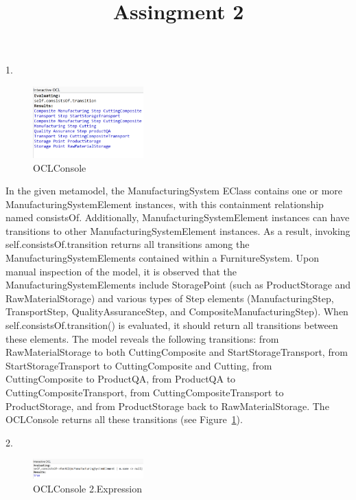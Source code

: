 \documentclass{article}
\title{Assingment 2}
\author{}
\date{}
\begin{document}
\maketitle

1. \begin{figure}
    \centering
    \includegraphics[width=0.38\textwidth]{images/Pasted image 20250518183913.png}
    \caption{OCLConsole}
    \label{fig:metamodel}
\end{figure}

In the given metamodel, the ManufacturingSystem EClass contains one or more ManufacturingSystemElement instances, with this containment relationship named consistsOf. Additionally, ManufacturingSystemElement instances can have transitions to other ManufacturingSystemElement instances. As a result, invoking self.consistsOf.transition returns all transitions among the ManufacturingSystemElements contained within a FurnitureSystem. Upon manual inspection of the model, it is observed that the ManufacturingSystemElements include StoragePoint (such as ProductStorage and RawMaterialStorage) and various types of Step elements (ManufacturingStep, TransportStep, QualityAssuranceStep, and CompositeManufacturingStep). When self.consistsOf.transition() is evaluated, it should return all transitions between these elements. The model reveals the following transitions: from RawMaterialStorage to both CuttingComposite and StartStorageTransport, from StartStorageTransport to CuttingComposite and Cutting, from CuttingComposite to ProductQA, from ProductQA to CuttingCompositeTransport, from CuttingCompositeTransport to ProductStorage, and from ProductStorage back to RawMaterialStorage. The OCLConsole returns all these transitions (see Figure~\ref{fig:metamodel}).



2. \begin{figure}
    \centering
    \includegraphics[width=0.38\textwidth]{images/Screenshot 2025-05-18 191855.png}
    \caption{OCLConsole 2.Expression}
    \label{fig:ex2}
\end{figure}
\end{document}
